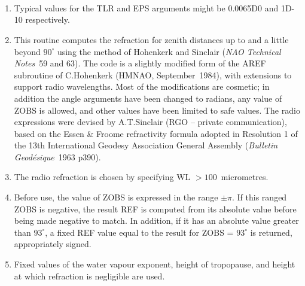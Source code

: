 {
}
{
  \\
  \\
  \\
  \\
  \\
  \\
  \\
  \\
}
{
}
\notes
{
 \begin{enumerate}
  \item Typical values for the TLR and EPS arguments might be 0.0065D0 and
        1D-10 respectively.
  \item This routine computes the refraction for zenith distances up to
        and a little beyond $90^{\circ}$ using the method of Hohenkerk and
        Sinclair ({\it NAO Technical Notes}\, 59 and 63).  The code is a
        slightly modified form of the AREF subroutine of C.Hohenkerk
        (HMNAO, September~1984), with extensions to support
        radio wavelengths.  Most of the modifications are cosmetic;
        in addition the angle arguments have been changed to radians,
        any value of ZOBS is allowed, and other values have been
        limited to safe values.
        The radio expressions were
        devised by A.T.Sinclair (RGO -- private communication), based on
        the Essen \& Froome refractivity formula adopted in Resolution 1
        of the 13th International Geodesy Association General Assembly
        ({\it Bulletin Geod\'esique}\, 1963 p390).
  \item The radio refraction is chosen by specifying WL $>100$~micrometres.
  \item Before use, the value of ZOBS is expressed in the range $\pm \pi$.
        If this ranged ZOBS is negative, the result REF is computed from its
        absolute value before being made negative to match.  In addition, if
        it has an absolute value greater than $93^{\circ}$, a fixed REF value
        equal to the result for ZOBS = $93^{\circ}$ is returned, appropriately
        signed.
  \item Fixed values of the water vapour exponent, height of tropopause, and
        height at which refraction is negligible are used.
  \end{enumerate}
}

